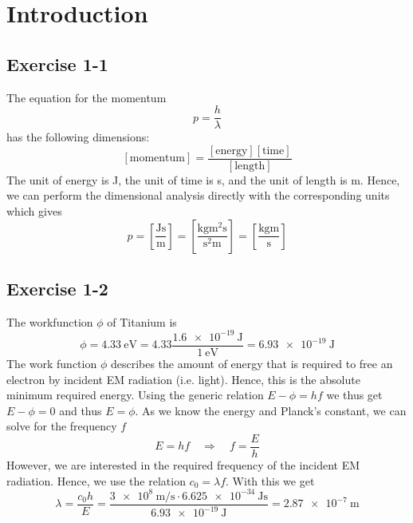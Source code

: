 \chapter{Introduction}

\section{Exercise 1-1}
The equation for the momentum
\begin{equation}
	p = \frac{h}{\lambda}
\end{equation}
has the following dimensions:
\[
	\left[\text{momentum}\right] = \frac{\left[\text{energy}\right] \left[\text{time}\right]}{\left[\text{length}\right]}
\]
The unit of energy is \si{\joule}, the unit of time is \si{\second}, and the
unit of length is \si{\meter}. Hence, we can perform the dimensional analysis
directly with the corresponding units which gives
\[
	p
	= \left[ \frac{\si{\joule} \si{\second}}{\si{\meter}} \right]
	= \left[ \frac{\si{\kilogram\meter\squared\second}}{\si{\second\squared\meter}} \right]
	= \left[ \frac{\si{\kilogram\meter}}{\si{\second}} \right]
\]

\section{Exercise 1-2}
The workfunction $\phi$ of Titanium is
\[
	\phi
	= \SI{4.33}{\eV}
	= 4.33 \frac{\SI{1.6e-19}{\joule}}{\SI{1}{\eV}}
	= \SI{6.93e-19}{\joule}
\]
The work function $\phi$ describes the amount of energy that is required to
free an electron by incident EM radiation (i.e. light). Hence, this is the
absolute minimum required energy. Using the generic relation
$E - \phi = h f$ we thus get $E - \phi = 0$ and thus $E = \phi$. As we know
the energy and Planck's constant, we can solve for the frequency $f$
\[
	E = h f \quad \Rightarrow \quad f = \frac{E}{h}
\]
However, we are interested in the required frequency of the incident EM
radiation. Hence, we use the relation $c_0 = \lambda f$. With this we get
\[
	\lambda
	= \frac{c_0 h}{E}
	= \frac{\SI{3e8}{\meter\per\second} \cdot \SI{6.625e-34}{\joule\second}}{\SI{6.93e-19}{\joule}}
	= \SI{2.87e-7}{\meter}
\]



